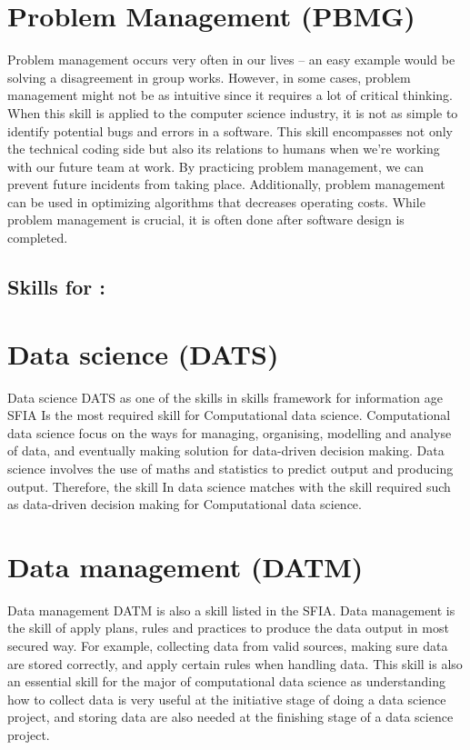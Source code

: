 \documentclass[a4paper, 11pt]{report}
\begin{document}
\section*{\textbf{Problem Management (PBMG)}}
Problem management occurs very often in our lives – an easy example would be solving a disagreement in group works. However, in some cases, problem management might not be as intuitive since it requires a lot of critical thinking. When this skill is applied to the computer science industry, it is not as simple to identify potential bugs and errors in a software. This skill encompasses not only the technical coding side but also its relations to humans when we’re working with our future team at work. By practicing problem management, we can prevent future incidents from taking place. Additionally, problem management can be used in optimizing algorithms that decreases operating costs. While problem management is crucial, it is often done after software design is completed.
\subsection{Skills for \majB: \studB}

\section*{\textbf{Data science (DATS)}}
Data science DATS as one of the skills in skills framework for information age SFIA Is the most required skill for Computational data science. Computational data science focus on the ways for managing, organising, modelling and analyse of data, and eventually making solution for data-driven decision making. Data science involves the use of maths and statistics to predict output and producing output. Therefore, the skill In data science matches with the skill required such as data-driven decision making for Computational data science.

\section*{\textbf{Data management (DATM)}}
Data management DATM is also a skill listed in the SFIA. Data management is the skill of apply plans, rules and practices to produce the data output in most secured way. For example, collecting data from valid sources, making sure data are stored correctly, and apply certain rules when handling data. This skill is also an essential skill for the major of computational data science as understanding how to collect data is very useful at the initiative stage of doing a data science project, and storing data are also needed at the finishing stage of a data science project. 
\end{document}
